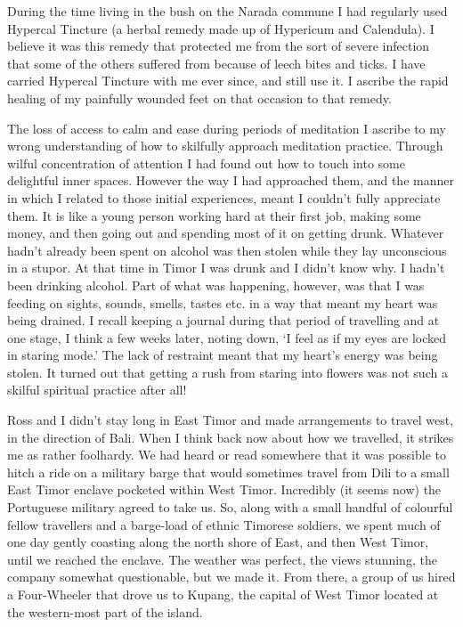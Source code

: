During the time living in the bush on the Narada commune I had regularly
used Hypercal Tincture (a herbal remedy made up of Hypericum and
Calendula). I believe it was this remedy that protected me from the sort
of severe infection that some of the others suffered from because of
leech bites and ticks. I have carried Hypercal Tincture with me ever
since, and still use it. I ascribe the rapid healing of my painfully
wounded feet on that occasion to that remedy.

The loss of access to calm and ease during periods of meditation I
ascribe to my wrong understanding of how to skilfully approach
meditation practice. Through wilful concentration of attention I had
found out how to touch into some delightful inner spaces. However the
way I had approached them, and the manner in which I related to those
initial experiences, meant I couldn't fully appreciate them. It is like
a young person working hard at their first job, making some money, and
then going out and spending most of it on getting drunk. Whatever hadn't
already been spent on alcohol was then stolen while they lay unconscious
in a stupor. At that time in Timor I was drunk and I didn't know why. I
hadn't been drinking alcohol. Part of what was happening, however, was that I was feeding on sights, sounds,
smells, tastes etc. in a way that meant my heart was being drained. I
recall keeping a journal during that period of travelling and at one
stage, I think a few weeks later, noting down, `I feel as if my eyes are
locked in staring mode.' The lack of restraint meant that my heart's
energy was being stolen. It turned out that getting a rush from staring
into flowers was not such a skilful spiritual practice after all!

Ross and I didn't stay long in East Timor and made arrangements to
travel west, in the direction of Bali. When I think back now about how
we travelled, it strikes me as rather foolhardy. We had heard or read
somewhere that it was possible to hitch a ride on a military barge that
would sometimes travel from Dili to a small East Timor enclave pocketed
within West Timor. Incredibly (it seems now) the Portuguese military
agreed to take us. So, along with a small handful of colourful fellow
travellers and a barge-load of ethnic Timorese soldiers, we spent much
of one day gently coasting along the north shore of East, and then West
Timor, until we reached the enclave. The weather was perfect, the views
stunning, the company somewhat questionable, but we made it. From there,
a group of us hired a Four-Wheeler that drove us to Kupang, the capital
of West Timor located at the western-most part of the island.

